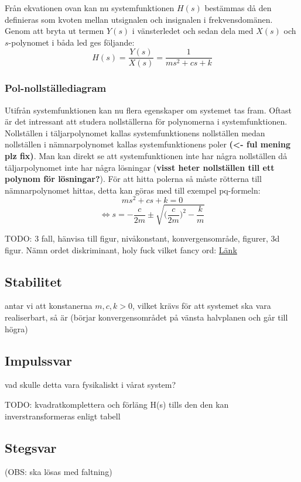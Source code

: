 Från ekvationen ovan kan nu systemfunktionen $H(s)$ bestämmas då den definieras som kvoten mellan utsignalen och insignalen i frekvensdomänen. Genom att bryta ut termen $Y(s)$ i vänsterledet och sedan dela med $X(s)$ och $s$-polynomet i båda led ges följande: 
$$H(s)=\frac{Y(s)}{X(s)}=\frac{1}{ms^2+cs+k}$$

\subsubsection{Pol-nollställediagram}
Utifrån systemfunktionen kan nu flera egenskaper om systemet tas fram. Oftast är det intressant att studera nollställerna för polynomerna i systemfunktionen. Nollställen i täljarpolynomet kallas systemfunktionens nollställen medan nollställen i nämnarpolynomet kallas systemfunktionens poler \textbf{(\textless- ful mening plz fix)}. Man kan direkt se att systemfunktionen inte har några nollställen då täljarpolynomet inte har några lösningar (\textbf{visst heter nollställen till ett polynom för lösningar?}). För att hitta polerna så måste rötterna till nämnarpolynomet hittas, detta kan göras med till exempel pq-formeln:
$$ms^2+cs+k=0$$
$$\Longleftrightarrow s=-\frac{c}{2m}\pm \sqrt{\bigg(\frac{c}{2m}\bigg)^2-\frac{k}{m}}$$

TODO: 3 fall, hänvisa till figur, nivåkonstant, konvergensområde, figurer, 3d figur.
Nämn ordet diskriminant, holy fuck vilket fancy ord:  \href{https://sv.wikipedia.org/wiki/Andragradsekvation#L.C3.B6sningsformeln}{Länk}


\subsection{Stabilitet}
antar vi att konstanerna $m, c, k >0$, vilket krävs för att systemet ska vara realiserbart, så är (börjar konvergensområdet på vänsta halvplanen och går till högra) 

\subsection{Impulssvar}
vad skulle detta vara fysikaliskt i vårat system?

TODO: kvadratkomplettera och förläng H(s) tills den den kan inverstransformeras enligt tabell

\subsection{Stegsvar}
(OBS: ska lösas med faltning)

